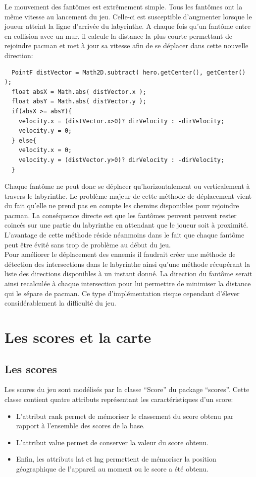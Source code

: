 \documentclass{article}
\begin{document}
Le mouvement des fantômes est extrêmement simple.
Tous les fantômes ont la même vitesse au lancement du jeu.
Celle-ci est susceptible d'augmenter lorsque le joueur atteint la ligne d'arrivée du labyrinthe.
A chaque fois qu'un fantôme entre en collision avec un mur, il calcule la distance la plus courte permettant de rejoindre pacman et met à jour sa vitesse afin de se déplacer dans cette nouvelle direction:
\begin{verbatim}
  PointF distVector = Math2D.subtract( hero.getCenter(), getCenter() );
  float absX = Math.abs( distVector.x );
  float absY = Math.abs( distVector.y );
  if(absX >= absY){
    velocity.x = (distVector.x>0)? dirVelocity : -dirVelocity;
    velocity.y = 0;
  } else{
    velocity.x = 0;
    velocity.y = (distVector.y>0)? dirVelocity : -dirVelocity;
  }
\end{verbatim}
Chaque fantôme ne peut donc se déplacer qu'horizontalement ou verticalement à travers le labyrinthe.
Le problème majeur de cette méthode de déplacement vient du fait qu'elle ne prend pas en compte les chemins disponibles pour rejoindre pacman.
La conséquence directe est que les fantômes peuvent peuvent rester coincés sur une partie du labyrinthe en attendant que le joueur soit à proximité.
L'avantage de cette méthode réside néanmoins dans le fait que chaque fantôme peut être évité sans trop de problème au début du jeu.\\

Pour améliorer le déplacement des ennemis il faudrait créer une méthode de détection des intersections dans le labyrinthe ainsi qu'une méthode récupérant la liste des directions disponibles à un instant donné.
La direction du fantôme serait ainsi recalculée à chaque intersection pour lui permettre de minimiser la distance qui le sépare de pacman.
Ce type d'implémentation risque cependant d'élever considérablement la difficulté du jeu.

\section{Les scores et la carte}
\subsection{Les scores}
Les scores du jeu sont modélisés par la classe \enquote{Score} du package \enquote{scores}.
Cette classe contient quatre attributs représentant les caractéristiques d'un score:\\
\begin{itemize}
  \item L'attribut rank permet de mémoriser le classement du score obtenu par rapport à l'ensemble des scores de la base.
  \item L'attribut value permet de conserver la valeur du score obtenu.
  \item Enfin, les attributs lat et lng permettent de mémoriser la position géographique de l'appareil au moment ou le score a été obtenu.\\
\end{itemize}
\end{document}
